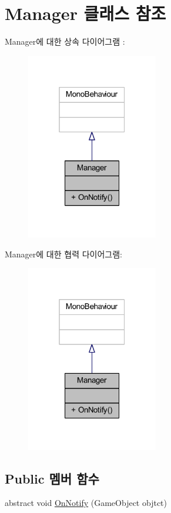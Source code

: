 \hypertarget{class_manager}{}\section{Manager 클래스 참조}
\label{class_manager}


Manager에 대한 상속 다이어그램 \+: \nopagebreak
\begin{figure}[H]
\begin{center}
\leavevmode
\includegraphics[width=163pt]{d6/df2/class_manager__inherit__graph}
\end{center}
\end{figure}


Manager에 대한 협력 다이어그램\+:\nopagebreak
\begin{figure}[H]
\begin{center}
\leavevmode
\includegraphics[width=163pt]{d1/db0/class_manager__coll__graph}
\end{center}
\end{figure}
\subsection*{Public 멤버 함수}
\begin{DoxyCompactItemize}
\item 
abstract void \mbox{\hyperlink{class_manager_af8f781331eb3451725d6b0a78131de19}{On\+Notify}} (Game\+Object objtct)
\end{DoxyCompactItemize}


